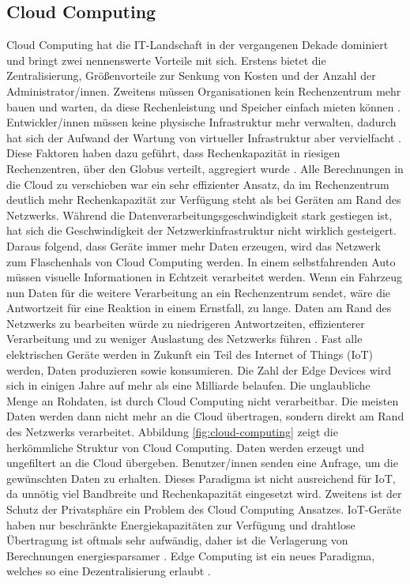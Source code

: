 \documentclass{sigchi}
\begin{document}
\subsection{Cloud Computing}
Cloud Computing hat die IT-Landschaft in der vergangenen Dekade dominiert und bringt zwei nennenswerte Vorteile mit sich. Erstens bietet die Zentralisierung, Größenvorteile zur Senkung von Kosten und der Anzahl der Administrator/innen. Zweitens müssen Organisationen kein Rechenzentrum mehr bauen und warten, da diese Rechenleistung und Speicher einfach mieten können \cite{emergence-edge-computing:2017}. Entwickler/innen müssen keine physische Infrastruktur mehr verwalten, dadurch hat sich der Aufwand der Wartung von virtueller Infrastruktur aber vervielfacht \cite{cloud-programming-simplified:2019}. Diese Faktoren haben dazu geführt, dass Rechenkapazität in riesigen Rechenzentren, über den Globus verteilt, aggregiert wurde \cite{emergence-edge-computing:2017}. Alle Berechnungen in die Cloud zu verschieben war ein sehr effizienter Ansatz, da im Rechenzentrum deutlich mehr Rechenkapazität zur Verfügung steht als bei Geräten am Rand des Netzwerks. Während die Datenverarbeitungsgeschwindigkeit stark gestiegen ist, hat sich die Geschwindigkeit der Netzwerkinfrastruktur nicht wirklich gesteigert. Daraus folgend, dass Geräte immer mehr Daten erzeugen, wird das Netzwerk zum Flaschenhals von Cloud Computing werden. In einem selbstfahrenden Auto müssen visuelle Informationen in Echtzeit verarbeitet werden. Wenn ein Fahrzeug nun Daten für die weitere Verarbeitung an ein Rechenzentrum sendet, wäre die Antwortzeit für eine Reaktion in einem Ernstfall, zu lange. Daten am Rand des Netzwerks zu bearbeiten würde zu niedrigeren Antwortzeiten, effizienterer Verarbeitung und zu weniger Auslastung des Netzwerks führen \cite{promise-edge-computing:2016}. Fast alle elektrischen Geräte werden in Zukunft ein Teil des Internet of Things (IoT) werden, Daten produzieren sowie konsumieren. Die Zahl der Edge Devices wird sich in einigen Jahre auf mehr als eine Milliarde belaufen. Die unglaubliche Menge an Rohdaten, ist durch Cloud Computing nicht verarbeitbar. Die meisten Daten werden dann nicht mehr an die Cloud übertragen, sondern direkt am Rand des Netzwerks verarbeitet. Abbildung \ref{fig:cloud-computing} zeigt die herkömmliche Struktur von Cloud Computing. Daten werden erzeugt und ungefiltert an die Cloud übergeben. Benutzer/innen senden eine Anfrage, um die gewünschten Daten zu erhalten. Dieses Paradigma ist nicht ausreichend für IoT, da unnötig viel Bandbreite und Rechenkapazität eingesetzt wird. Zweitens ist der Schutz der Privatsphäre ein Problem des Cloud Computing Ansatzes. IoT-Geräte haben nur beschränkte Energiekapazitäten zur Verfügung und drahtlose Übertragung ist oftmals sehr aufwändig, daher ist die Verlagerung von Berechnungen energiesparsamer \cite{vision-challenges:2016}. Edge Computing ist ein neues Paradigma, welches so eine Dezentralisierung erlaubt \cite{emergence-edge-computing:2017}. 
\end{document}
